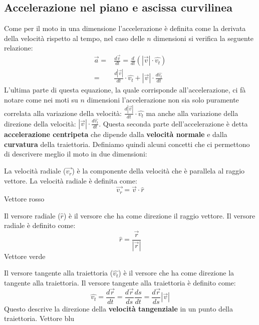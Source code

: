     \subsection{Accelerazione nel piano e ascissa curvilinea}
        Come per il moto in una dimensione l'accelerazione è definita come la derivata della velocità rispetto al tempo, nel caso delle $n$ dimensioni si verifica la seguente relazione:
        $$
            \begin{aligned}
                \vec{a}=&\frac{d\vec{v}}{dt}=\frac{d}{dt}\left(\left|\vec{v}\right|\cdot\hat{v_t}\right)\\ 
                =&\frac{d\left|\vec{v}\right|}{dt}\cdot\hat{v_t}+\left|\vec{v}\right|\cdot\frac{d\hat{v_t}}{dt}
            \end{aligned}
        $$
        L'ultima parte di questa equazione, la quale corrisponde all'accelerazione, ci fà notare come nei moti su $n$ dimensioni l'accelerazione non sia solo puramente correlata alla variazione della velocità: $ \frac{d|\vec{v}|}{dt}\cdot\hat{v_t} $ ma anche alla variazione della direzione della velocità: $ \left|\vec{v}\right|\cdot\frac{d\hat{v_t}}{dt} $. Questa seconda parte dell'accelerazione è detta \textbf{accelerazione centripeta} che dipende dalla \textbf{velocità normale} e dalla \textbf{curvatura} della traiettoria.
        Definiamo quindi alcuni concetti che ci permettono di descrivere meglio il moto in due dimensioni:
        \begin{definition}
            La velocità radiale ($\vec{v_r}$) è la componente della velocità che è parallela al raggio vettore. La velocità radiale è definita come:
            $$
                \vec{v_r} = \vec{v}\cdot\hat{r}
            $$
            {\footnotesize Vettore rosso}
        \end{definition}
        \begin{definition}
            Il versore radiale ($\hat{r}$) è il versore che ha come direzione il raggio vettore. Il versore radiale è definito come:
            $$
                \hat{r} = \frac{\vec{r}}{\left|\vec{r}\right|}
            $$
            {\footnotesize Vettore verde}
        \end{definition}
        \begin{definition}
            Il versore tangente alla traiettoria ($\hat{v_t}$) è il versore che ha come direzione la tangente alla traiettoria. Il versore tangente alla traiettoria è definito come:
            $$
                \hat{v_t} = \frac{d\vec{r}}{dt} = \frac{d\vec{r}}{ds}\frac{ds}{dt} = \frac{d\vec{r}}{ds}\left|\vec{v}\right|
            $$
            Questo descrive la direzione della \textbf{velocità tangenziale} in un punto della traiettoria.
            {\footnotesize Vettore blu}
        \end{definition}
